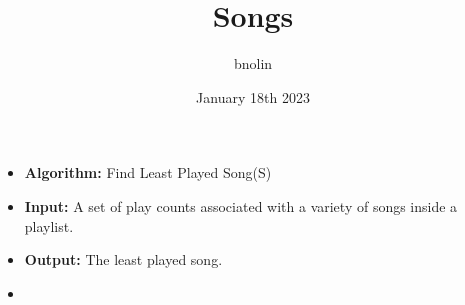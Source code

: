 \documentclass{article}
\title{Songs}
\author{bnolin}
\date{January 18th 2023}
\begin{document}
\begin{itemize}
\item[]
\textbf{Algorithm:} Find Least Played Song(S)
\item[]
\textbf{Input:} A set of play counts associated with a variety of songs inside a playlist.
\item[]
\textbf{Output:} The least played song.
\item[]
\end{itemize}
\end{document}
